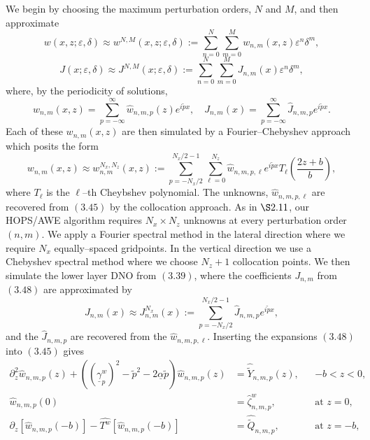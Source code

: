 We begin by choosing the maximum perturbation orders, $N$ and $M$, and then approximate
\begin{equation}
w(x,z;\varepsilon,\delta)\approx w^{N,M}(x,z;\varepsilon,\delta):=\sum_{n=0}^N\sum_{m=0}^{M}w_{n,m}(x,z)\varepsilon^n\delta^m,
\end{equation}
\begin{equation}
J(x;\varepsilon,\delta)\approx J^{N,M}(x;\varepsilon,\delta) :=\sum_{n=0}^N\sum_{m=0}^{M}J_{n,m}(x)\varepsilon^n\delta^m,
\end{equation}
where, by the periodicity of solutions,
\begin{equation}w_{n,m}(x,z)=\sum_{p=-\infty}^{\infty}\hat{w}_{n,m,p}(z)e^{i\tilde{p} x},\quad J_{n,m}(x)=\sum_{p=-\infty}^{\infty}\hat{J}_{n,m,p}e^{i\tilde{p} x}.\end{equation}
Each of these $w_{n,m}(x,z)$ are then simulated by a 
Fourier--Chebyshev approach which posits the form
$$
w_{n,m}(x,z) \approx w_{n,m}^{N_x,N_z}(x,z)
  := \sum_{p = -N_x/2}^{N_x/2-1} \sum_{\ell=0}^{N_z}
  \hat{w}_{n,m,p,\ell} e^{i \tilde{p} x} 
  T_{\ell} \left( \frac{2z+b}{b} \right),
$$
where $T_{\ell}$ is the $\ell$--th Cheybshev polynomial.
The unknowns, $\hat{w}_{n,m,p,\ell}$ are recovered 
from $(3.45)$ by the collocation approach. As in $\S 2.11$, our HOPS/AWE algorithm requires $N_x \times N_z$ unknowns at every perturbation order $(n,m)$. We apply a Fourier spectral method in the lateral direction where we require $N_x$ equally--spaced gridpoints. In the vertical direction we use a Chebyshev spectral method where we choose $N_z + 1$ collocation points.
We then simulate the lower layer DNO from 
$(3.39)$, where the coefficients $J_{n,m}$ from $(3.48)$ are approximated by
$$
J_{n,m}(x) \approx J_{n,m}^{N_x}(x) 
  := \sum_{p=-N_x/2}^{N_x/2-1} \hat{J}_{n,m,p} e^{i \tilde{p} x},
$$
and the $\hat{J}_{n,m,p}$ are recovered from the
$\hat{w}_{n,m,p,\ell}$. Inserting the expansions $(3.48)$ into $(3.45)$ gives
\begin{subequations}
\begin{align}
\partial_z^2\hat{w}_{n,m,p}(z)+\left((\underline{\gamma}_p^w)^2-\tilde{p}^2-2\underline{\alpha}\tilde{p}\right)\hat{w}_{n,m,p}(z)&=\hat{\tilde{Y}}_{n,m,p}(z),&&\text{$-b<z<0$},\\
\hat{w}_{n,m,p}(0)&=\hat{\zeta}^w_{n,m,p},&& \text{at $z=0$},\\
\partial_z \left[\hat{w}_{n,m,p}(-b)\right] - \hat{T^w}[\hat{w}_{n,m,p}(-b)]&=\hat{\tilde{Q}}_{n,m,p},&& \text{at $z=-b$},
\end{align}
\end{subequations}
